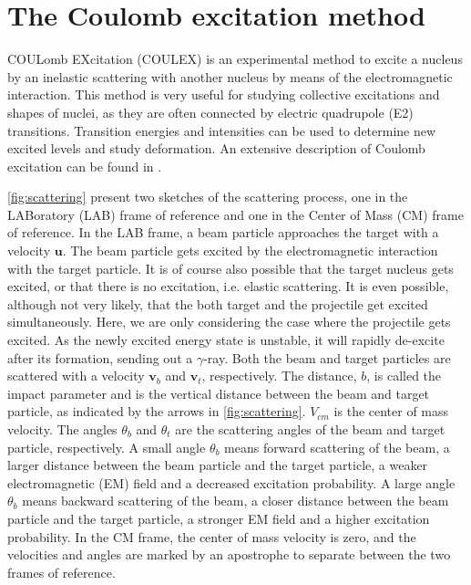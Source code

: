 \documentclass[twoside,english]{uiofysmaster/uiofysmaster}
\newcommand{\ga}{$\gamma$}
\let\orgautoref\autoref
\renewcommand{\autoref}
        {%
		 \def\sectionautorefname{Section}%
		 \def\subsectionautorefname{Section}%
		 \def\subsubsectionautorefname{Section}%
		 \def\chapterautorefname{Chapter}%
          \orgautoref}
\begin{document}
\section{The Coulomb excitation method}\label{sec:Coulex}
COULomb EXcitation (COULEX) is an experimental method to excite a nucleus by an inelastic scattering with another nucleus by means of the electromagnetic interaction. 
This method is very useful for studying collective excitations and shapes of nuclei, as they are often connected by electric quadrupole (E2) transitions.  
Transition energies and intensities can be used to determine new excited levels and study deformation.
An extensive description of Coulomb excitation can be found in \cite{Alder1956, EE-Coulex, Bertulani2009}.

\autoref{fig:scattering} present two sketches of the scattering process, one in the LABoratory (LAB) frame of reference and one in the Center of Mass (CM) frame of reference. 
In the LAB frame, a beam particle approaches the target with a velocity $\mathbf{u}$.
The beam particle gets excited by the electromagnetic interaction with the target particle. 
It is of course also possible that the target nucleus gets excited, or that there is no excitation, i.e. elastic scattering. 
It is even possible, although not very likely, that the both target and the projectile get excited simultaneously.
Here, we are only considering the case where the projectile gets excited.
As the newly excited energy state is unstable, it will rapidly de-excite after its formation, sending out a \ga-ray. 
Both the beam and target particles are scattered with a velocity $\mathbf{v}_b$ and $\mathbf{v}_t$, respectively.
The distance, $b$, is called the impact parameter and is the vertical distance between the beam and target particle, as indicated by the arrows in \autoref{fig:scattering}. 
$V_{cm}$ is the center of mass velocity. 
The angles $\theta_b$ and $\theta_t$ are the scattering angles of the beam and target particle, respectively. 
A small angle $\theta_b$ means forward scattering of the beam, a larger distance between the beam particle and the target particle, a weaker electromagnetic (EM) field and a decreased excitation probability. 
A large angle $\theta_b$ means backward scattering of the beam, a closer distance between the beam particle and the target particle, a stronger EM field and a higher excitation probability.
In the CM frame, the center of mass velocity is zero, and the velocities and angles are marked by an apostrophe to separate between the two frames of reference.
\end{document}
